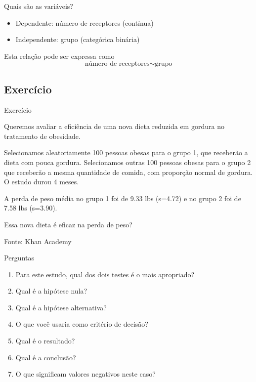 \documentclass{beamer}
\begin{document}
\begin{frame}{Quais são as variáveis?}
  \begin{itemize}
  \item Dependente: número de receptores (contínua)
  \item Independente: grupo (categórica binária)
  \end{itemize}
  \vfill
  \begin{block}{Esta relação pode ser expressa como}
    \begin{displaymath}
      \text{número de receptores} \sim \text{grupo}
    \end{displaymath}
  \end{block}
\end{frame}

\subsection{Exercício}

\begin{frame}{Exercício}
  \begin{exampleblock}{}
    \small
    Queremos avaliar a eficiência de uma nova dieta reduzida em
    gordura no tratamento de obesidade.

    \bigskip
    {\footnotesize
      Selecionamos aleatoriamente 100 pessoas obesas para o grupo 1, que receberão a dieta com pouca gordura.
      Selecionamos outras 100 pessoas obesas para o grupo 2 que receberão a mesma quantidade de comida, com proporção normal de gordura.
      O estudo durou 4 meses.
    }

    \bigskip
    \begin{exampleblock}{}
      \footnotesize
      A perda de peso média no grupo 1 foi de 9.33 lbs
      (s=4.72) e no grupo 2 foi de 7.58 lbs (s=3.90).
    \end{exampleblock}
  \end{exampleblock}
  \begin{block}{}
    Essa nova dieta é eficaz na perda de peso?
  \end{block}
  \hfill {\footnotesize Fonte: Khan Academy}
\end{frame}

\begin{frame}[label=perguntas]{Perguntas}
  \begin{enumerate}
  \item Para este estudo, qual dos dois testes é o mais apropriado?
  \item Qual é a hipótese nula?
  \item Qual é a hipótese alternativa?
  \item O que você usaria como critério de decisão?
  \item Qual é o resultado?
  \item Qual é a conclusão?
  \item O que significam valores negativos neste caso?
  \end{enumerate}
\end{frame}
\end{document}
